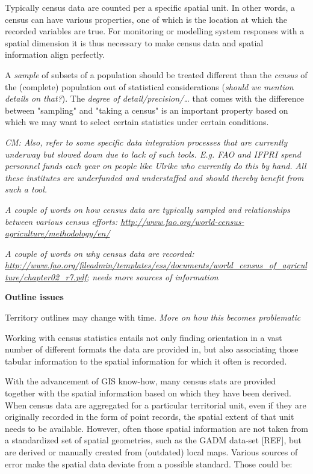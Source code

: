 \documentclass[12pt,]{article}
\begin{document}
Typically census data are counted per a specific spatial unit. In other words, a census can have various properties, one of which is the location at which the recorded variables are true.
For monitoring or modelling system responses with a spatial dimension it is thus necessary to make census data and spatial information align perfectly.

A \emph{sample} of subsets of a population should be treated different than the \emph{census} of the (complete) population out of statistical considerations (\emph{should we mention details on that?}).
The \emph{degree of detail/precision/\ldots{}} that comes with the difference between "sampling" and "taking a census" is an important property based on which we may want to select certain statistics under certain conditions.

\emph{CM: Also, refer to some specific data integration processes that are currently underway but slowed down due to lack of such tools. E.g. FAO and IFPRI spend personnel funds each year on people like Ulrike who currently do this by hand. All these institutes are underfunded and understaffed and should thereby benefit from such a tool.}

\emph{A couple of words on how census data are typically sampled and relationships between various census efforts: \url{http://www.fao.org/world-census-agriculture/methodology/en/}}

\emph{A couple of words on why census data are recorded: \url{http://www.fao.org/fileadmin/templates/ess/documents/world_census_of_agriculture/chapter02_r7.pdf}; needs more sources of information}

\textbf{Outline issues}

Territory outlines may change with time. \emph{More on how this becomes problematic}

Working with census statistics entails not only finding orientation in a vast number of different formats the data are provided in, but also associating those tabular information to the spatial information for which it often is recorded.

With the advancement of GIS know-how, many census stats are provided together with the spatial information based on which they have been derived.
When census data are aggregated for a particular territorial unit, even if they are originally recorded in the form of point records, the spatial extent of that unit needs to be available.
However, often those spatial information are not taken from a standardized set of spatial geometries, such as the GADM data-set {[}REF{]}, but are derived or manually created from (outdated) local maps.
Various sources of error make the spatial data deviate from a possible standard. Those could be:
\end{document}
